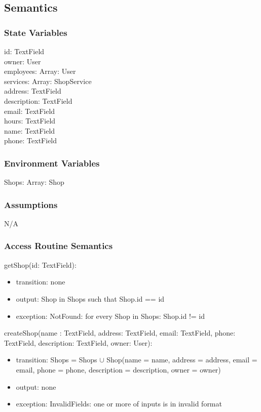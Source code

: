 \documentclass[12pt, titlepage]{article}
\begin{document}
\subsection{Semantics}

\subsubsection{State Variables}
 
id: TextField \\
owner: User \\
employees: Array: User \\
services: Array: ShopService \\
address: TextField \\ 
description: TextField \\ 
email: TextField \\ 
hours: TextField \\
name: TextField \\
phone: TextField \\

\subsubsection{Environment Variables}

Shops: Array: Shop

\subsubsection{Assumptions}

N/A

\subsubsection{Access Routine Semantics}

\noindent getShop(id: TextField):
\begin{itemize}
    \item transition: none
    \item output: Shop in Shops such that Shop.id == id
    \item exception: NotFound: for every Shop in Shops: Shop.id != id
\end{itemize}

\noindent createShop(name : TextField, address: TextField, email: TextField, phone: TextField, description: TextField, owner: User):
\begin{itemize}
    \item transition: Shops = Shops $\cup$ Shop(name = name, address = address, email = email, phone = phone, description = description, owner = owner)
    \item output: none
    \item exception: InvalidFields: one or more of inputs is
    in invalid format
\end{itemize}
\end{document}
